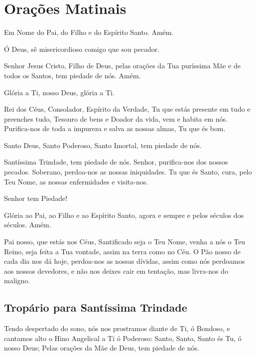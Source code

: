 \documentclass{subfiles}
\begin{document}
\chapter{Orações Matinais}

 
Em Nome do Pai, do Filho e do Espírito Santo. Amém. 
 
 
Ó Deus, sê misericordioso comigo que sou pecador. 
  
Senhor Jesus Cristo, Filho de Deus, pelas orações da Tua puríssima Mãe 
e de todos os Santos, tem piedade de nós. Amém. 
 
Glória a Ti, nosso Deus, glória a Ti. 
 
Rei dos Céus, Consolador, Espírito da Verdade, Tu que estás presente 
em tudo e preenches tudo, Tesouro de bens e Doador da vida, vem e habita 
em nós. Purifica-nos de toda a impureza e salva as nossas almas, Tu que és 
bom. 
 
Santo Deus, Santo Poderoso, Santo Imortal, tem piedade de nós. 

Santíssima Trindade, tem piedade de nós. Senhor, purifica-nos dos 
nossos pecados. Soberano, perdoa-nos as nossas iniquidades. Tu que és Santo, 
cura, pelo Teu Nome, as nossas enfermidades e visita-nos.
 
Senhor tem Piedade! 
 
Glória ao Pai, ao Filho e ao Espírito Santo, agora e sempre e pelos 
séculos dos séculos. Amém. 
 
Pai nosso, que estás nos Céus, Santificado seja o Teu Nome, venha a 
nós o Teu Reino, seja feita a Tua vontade, assim na terra como no Céu. O Pão 
nosso de cada dia nos dá hoje, perdoa-nos as nossas dívidas, assim como nós 
perdoamos aos nossos devedores, e não nos deixes cair em tentação, mas 
livra-nos do maligno.

\section{Tropário para Santíssima Trindade}

Tendo despertado do sono, nós nos prostramos diante de Ti, ó 
Bondoso, e cantamos alto o Hino Angelical a Ti ó Poderoso: Santo, Santo, Santo 
és Tu, ó nosso Deus; Pelas orações da Mãe de Deus, tem piedade de nós. 
 
\end{document}

